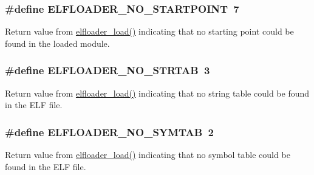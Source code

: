 \subsubsection[{E\+L\+F\+L\+O\+A\+D\+E\+R\+\_\+\+N\+O\+\_\+\+S\+T\+A\+R\+T\+P\+O\+I\+N\+T}]{\setlength{\rightskip}{0pt plus 5cm}\#define E\+L\+F\+L\+O\+A\+D\+E\+R\+\_\+\+N\+O\+\_\+\+S\+T\+A\+R\+T\+P\+O\+I\+N\+T~7}\label{group__elfloader_ga98dc2983b4456dc3484f1144347da8d2}
Return value from \hyperlink{group__elfloader_ga57190d49fcc860d9a780f2860e896a5b}{elfloader\+\_\+load()} indicating that no starting point could be found in the loaded module. \hypertarget{group__elfloader_ga75a62386c75729c352ecf37de87121cc}{}
\subsubsection[{E\+L\+F\+L\+O\+A\+D\+E\+R\+\_\+\+N\+O\+\_\+\+S\+T\+R\+T\+A\+B}]{\setlength{\rightskip}{0pt plus 5cm}\#define E\+L\+F\+L\+O\+A\+D\+E\+R\+\_\+\+N\+O\+\_\+\+S\+T\+R\+T\+A\+B~3}\label{group__elfloader_ga75a62386c75729c352ecf37de87121cc}
Return value from \hyperlink{group__elfloader_ga57190d49fcc860d9a780f2860e896a5b}{elfloader\+\_\+load()} indicating that no string table could be found in the E\+L\+F file. \hypertarget{group__elfloader_ga1f5f088314c4af0fe4889c5f282b07f1}{}
\subsubsection[{E\+L\+F\+L\+O\+A\+D\+E\+R\+\_\+\+N\+O\+\_\+\+S\+Y\+M\+T\+A\+B}]{\setlength{\rightskip}{0pt plus 5cm}\#define E\+L\+F\+L\+O\+A\+D\+E\+R\+\_\+\+N\+O\+\_\+\+S\+Y\+M\+T\+A\+B~2}\label{group__elfloader_ga1f5f088314c4af0fe4889c5f282b07f1}
Return value from \hyperlink{group__elfloader_ga57190d49fcc860d9a780f2860e896a5b}{elfloader\+\_\+load()} indicating that no symbol table could be found in the E\+L\+F file. \hypertarget{group__elfloader_ga8b8819f1e0118bf282c0097beb3d5570}{}
